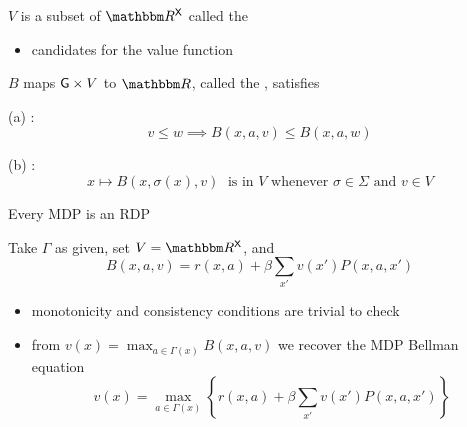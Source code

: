 \documentclass[dvipsnames]{beamer}
\begin{document}
\begin{frame}

     $V$ is a subset of $\RR^\Xsf$ called the 

    \begin{itemize}
        \item[$\to$] candidates for the value function
    \end{itemize}


            \vspace{0.5em}
            \vspace{0.5em}
    
     $B$ maps $\mathsf G \times V$ to $\RR$,
     called the , satisfies

            \vspace{0.5em}
     (a) :
    \begin{equation*}
        v \leq w \implies
        B(x, a, v) \leq B(x, a, w)
    \end{equation*}

    (b) :
    \begin{equation*}
        x \mapsto B(x, \sigma(x), v)
        \; \text{ is in $V$ whenever }
        \sigma \in \Sigma
        \text{ and }
        v \in V
    \end{equation*}


\end{frame}




\begin{frame}
    
    \Eg Every MDP is an RDP 

    \vspace{0.5em}
    \vspace{0.5em}
    Take $\Gamma$ as given, set $V = \RR^\Xsf$, and 
    \begin{equation*}
        B(x, a, v) = r(x, a) + \beta \sum_{x'} v(x') P(x, a, x')
    \end{equation*}

    \vspace{0.5em}
    \begin{itemize}
        \item monotonicity and consistency conditions are trivial to check
        \vspace{0.5em}
        \item from $v(x) = \max_{a \in \Gamma(x)} B(x, a, v)$ we recover the MDP
        Bellman equation
        \begin{equation*}
            v(x) = \max_{a \in \Gamma(x)} 
            \left\{
                r(x, a) + \beta \sum_{x'} v(x') P(x, a, x')
            \right\}
        \end{equation*}
    \end{itemize}



\end{frame}
\end{document}
